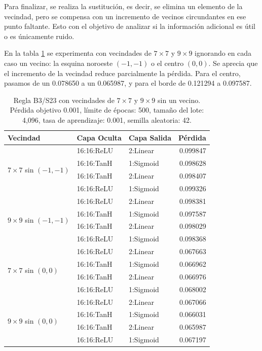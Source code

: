 Para finalizar, se realiza la sustitución, es decir, se elimina un elemento de la vecindad, pero se compensa con un incremento de vecinos circundantes en ese punto faltante. Esto con el objetivo de analizar si la información adicional es útil o es únicamente ruido.

En la tabla \ref{tab:vecindad_reducida_ampliada} se experimenta con vecindades de $7 \times 7$ y $9 \times 9$ ignorando en cada caso un vecino: la esquina noroeste $(-1,-1)$ o el centro $(0,0)$. Se aprecia que el incremento de la vecindad reduce parcialmente la pérdida. Para el centro, pasamos de un 0.078650 a un 0.065987, y para el borde de 0.121294 a 0.097587.

\begin{table}[H]
	\centering
	\footnotesize
	\begin{tabular}{lllr}
		\toprule
		\textbf{Vecindad} & \textbf{Capa Oculta} & \textbf{Capa Salida} & \textbf{Pérdida} \\
		\midrule
		\multirow{4}{*}{$7\times7$ sin $(-1,-1)$} & 16:16:ReLU & 2:Linear & 0.099847 \\
		& 16:16:TanH & 1:Sigmoid & 0.098628 \\
		& 16:16:TanH & 2:Linear & 0.098407 \\
		& 16:16:ReLU & 1:Sigmoid & 0.099326 \\
		\midrule
		\multirow{4}{*}{$9\times9$ sin $(-1,-1)$} & 16:16:ReLU & 2:Linear & 0.098381 \\
		& 16:16:TanH & 1:Sigmoid & 0.097587 \\
		& 16:16:TanH & 2:Linear & 0.098029 \\
		& 16:16:ReLU & 1:Sigmoid & 0.098368 \\
		\midrule
		\multirow{4}{*}{$7\times7$ sin $(0,0)$} & 16:16:ReLU & 2:Linear & 0.067663 \\
		& 16:16:TanH & 1:Sigmoid & 0.066962 \\
		& 16:16:TanH & 2:Linear & 0.066976 \\
		& 16:16:ReLU & 1:Sigmoid & 0.068002 \\
		\midrule
		\multirow{4}{*}{$9\times9$ sin $(0,0)$} & 16:16:ReLU & 2:Linear & 0.067066 \\
		& 16:16:TanH & 1:Sigmoid & 0.066031 \\
		& 16:16:TanH & 2:Linear & 0.065987 \\
		& 16:16:ReLU & 1:Sigmoid & 0.067197 \\
		\bottomrule
	\end{tabular}
	\caption{Regla B3/S23 con vecindades de $7\times7$ y $9\times9$ sin un vecino. Pérdida objetivo 0.001, límite de épocas: 500, tamaño del lote: 4,096, tasa de aprendizaje: 0.001, semilla aleatoria: 42.}
	\label{tab:vecindad_reducida_ampliada}
\end{table}

